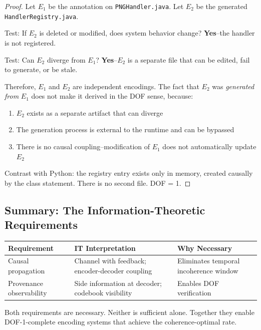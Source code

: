 \begin{proof}
Let $E_1$ be the annotation on \texttt{PNGHandler.java}. Let $E_2$ be the generated \texttt{HandlerRegistry.java}.

Test: If $E_2$ is deleted or modified, does system behavior change? \textbf{Yes}--the handler is not registered.

Test: Can $E_2$ diverge from $E_1$? \textbf{Yes}--$E_2$ is a separate file that can be edited, fail to generate, or be stale.

Therefore, $E_1$ and $E_2$ are independent encodings. The fact that $E_2$ was \emph{generated from} $E_1$ does not make it derived in the DOF sense, because:
\begin{enumerate}
\tightlist
\item $E_2$ exists as a separate artifact that can diverge
\item The generation process is external to the runtime and can be bypassed
\item There is no causal coupling--modification of $E_1$ does not automatically update $E_2$
\end{enumerate}

Contrast with Python: the registry entry exists only in memory, created causally by the class statement. There is no second file. DOF = 1.
\end{proof}

\subsection{Summary: The Information-Theoretic Requirements}\label{sec:req-summary}

\begin{center}
\begin{tabularx}{\linewidth}{lYY}
\toprule
\textbf{Requirement} & \textbf{IT Interpretation} & \textbf{Why Necessary} \\
\midrule
Causal propagation & Channel with feedback; encoder-decoder coupling & Eliminates temporal incoherence window \\
Provenance observability & Side information at decoder; codebook visibility & Enables DOF verification \\
\bottomrule
\end{tabularx}
\end{center}

Both requirements are necessary. Neither is sufficient alone. Together they enable DOF-1-complete encoding systems that achieve the coherence-optimal rate.

